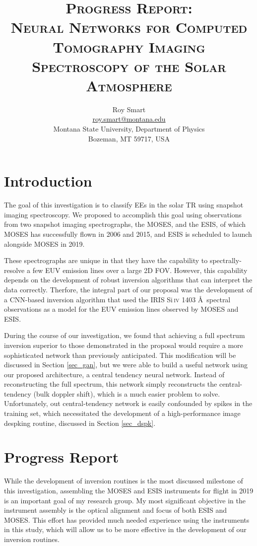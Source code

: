 \documentclass[10pt,letterpaper]{article}
\title{\textsc{Progress Report: \\ Neural Networks for Computed Tomography Imaging Spectroscopy of the Solar Atmosphere}}
\author{Roy Smart \\ \url{roy.smart@montana.edu} \\ Montana State University, Department of Physics \\ Bozeman, MT 59717, USA}
\begin{document}
	
	\maketitle
	
	\section{Introduction}
	
		The goal of this investigation is to classify \acp{EE} in the solar \ac{TR} using snapshot imaging spectroscopy. 
		We proposed to accomplish this goal using observations from two snapshot imaging spectrographs, the \ac{MOSES}, and the \ac{ESIS}, of which \ac{MOSES} has successfully flown in 2006 and 2015, and \ac{ESIS} is scheduled to launch alongside \ac{MOSES} in 2019.
		
		These spectrographs are unique in that they have the capability to spectrally-resolve a few \ac{EUV} emission lines over a large 2D \ac{FOV}.
		However, this capability depends on the development of robust inversion algorithms that can interpret the data correctly.
		Therfore, the integral part of our proposal was the development of a \ac{CNN}-based inversion algorithm that used the IRIS Si\,\textsc{iv} 1403 \AA\ spectral observations as a model for the \ac{EUV} emission lines observed by MOSES and ESIS.
		
		During the course of our investigation, we found that achieving a full spectrum inversion superior to those demonstrated in the proposal would require a more sophisticated network than previously anticipated.
		This modification will be discussed in Section \ref{sec_gan}, but we were able to build a useful network using our proposed architecture, a central tendency neural network.
		Instead of reconstructing the full spectrum, this network simply reconstructs the central-tendency (bulk doppler shift), which is a much easier problem to solve.
		Unfortunately, out central-tendency network is easily confounded by spikes in the training set, which necessitated the development of a high-performance image despking routine, discussed in Section \ref{sec_dspk}.
		
	
	\section{Progress Report}
	
		While the development of inversion routines is the most discussed milestone of this investigation, assembling the MOSES and ESIS instruments for flight in 2019 is an important goal of my research group.
		My most significant objective in the instrument assembly is the optical alignment and focus of both ESIS and MOSES. 
		This effort has provided much needed experience using the instruments in this study, which will allow us to be more effective in the development of our inversion routines.
		
\end{document}
